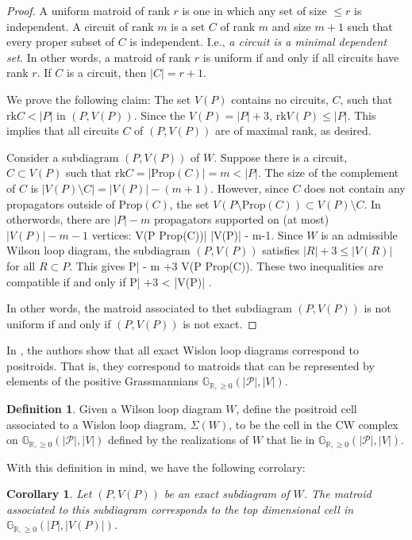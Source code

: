 \documentclass[11pt]{article}
\newcommand{\R}{\mathbb{R}}
\newcommand{\Gr}{\mathbb{G}_{\R, \geq 0}}
\newcommand{\rk}{\textrm{rk}}
\def\bas #1\eas{\begin{align*} #1 \end{align*}}
\newcommand{\cP}{\mathcal{P}}
\newcommand{\Prop}{\textrm{Prop}}
\newtheorem{cor}[thm]{Corollary}
\theoremstyle{remark}
\theoremstyle{definition}
\newtheorem{dfn}[thm]{Definition}
\begin{document}
\begin{proof}
A uniform matroid of rank $r$ is one in which any set of size $ \leq r$ is independent. A circuit of rank $m$ is a set $C$ of rank $m$ and size $m+1$ such that every proper subset of $C$ is independent. I.e., \emph{a circuit is a minimal dependent set.} In other words, a matroid of rank $r$ is uniform if and only if all circuits have rank $r$. If $C$ is a circuit, then $|C| = r+1$.

We prove the following claim: The set $V(P)$ contains no circuits, $C$, such that  $\rk C< |P|$ in $(P, V(P))$. Since the $V(P) = |P|+3$, $\rk V(P) \leq |P|$. This implies that all circuits $C$ of $(P, V(P))$ are of maximal rank, as desired.

Consider a subdiagram $(P, V(P))$ of $W$. Suppose there is a circuit, $C \subset V(P)$ such that $\rk C = |\Prop (C) | = m < |P|$. The size of the complement of $C$ is $|V(P) \setminus C| = |V(P)| -(m+1)$. However, since $C$ does not contain any propagators outside of $\Prop (C)$, the set $V(P \setminus \Prop(C)) \subset V(P )\setminus C$. In otherwords, there are $|P| - m$ propagators supported on (at most) $|V(P)|-m -1$ vertices: \bas |V(P \setminus \Prop (C))| \leq |V(P)| - m-1\;. \eas Since $W$ is an admissible Wilson loop diagram, the subdiagram $(P, V(P))$ satisfies $|R| +3 \leq |V(R)|$ for all $R \subset P$.  This gives \bas |P| - m +3 \leq V(P \setminus \Prop(C))\;. \eas These two inequalities are compatible if and only if \bas |P| +3 < |V(P)| \;. \eas

In other words, the matroid associated to thet subdiagram $(P, V(P))$ is not uniform if and only if $(P, V(P))$ is not exact.
\end{proof}

In \cite{wilsonloops}, the authors show that all exact Wislon loop diagrams correspond to positroids. That is, they correspond to matroids that can be represented by elements of the positive Grassmannians $\Gr(|\cP|, |V|)$.

\begin{dfn}
Given a Wilson loop diagram $W$, define the positroid cell associated to a Wislon loop diagram, $\Sigma(W)$, to be the cell in the CW complex on $\Gr(|\cP|, |V|)$ defined by the realizations of $W$ that lie in $\Gr(|\cP|, |V|)$.
\end{dfn}

With this definition in mind, we have the following corrolary:

\begin{cor}
Let $(P, V(P))$ be an exact subdiagram of $W$. The matroid associated to this subdiagram corresponds to the top dimensional cell in $\Gr(|P|, |V(P)|)$.
\end{cor}
\end{document}

